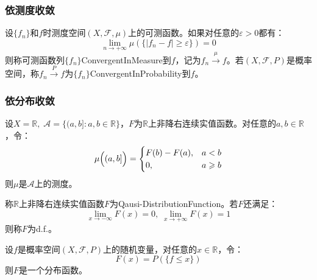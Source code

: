 \subsubsection{依测度收敛}
\begin{definition}
	设$\{f_n\}$和$f$时测度空间$(X,\mathscr{F},\mu)$上的可测函数。如果对任意的$\varepsilon>0$都有：
	\begin{equation*}
		\lim_{n\to+\infty}\mu(\{|f_n-f|\geqslant\varepsilon\})=0
	\end{equation*}
	则称可测函数列$\{f_n\}$\gls{ConvergentInMeasure}到$f$，记为$f_n\overset{\mu}{\longrightarrow}f$。若$(X,\mathscr{F},P)$是概率空间，称$f_n\overset{P}{\longrightarrow}f$为$\{f_n\}$\gls{ConvergentInProbability}到$f$。
\end{definition}
\subsubsection{依分布收敛}
\begin{theorem}
	设$X=\mathbb{R},\;\mathscr{A}=\{(a,b]:a,b\in\mathbb{R}\}$，$F$为$\mathbb{R}$上非降右连续实值函数。对任意的$a,b\in\mathbb{R}$，令：
	\begin{equation*}
		\mu\Bigl((a,b]\Bigr)=
		\begin{cases}
			F(b)-F(a),&a<b \\
			0,&a\geqslant b
		\end{cases}
	\end{equation*}
	则$\mu$是$\mathscr{A}$上的测度。
\end{theorem}
\begin{definition}
	称$\mathbb{R}$上非降右连续实值函数$F$为\gls{Qausi-DistributionFunction}。若$F$还满足：
	\begin{equation*}
		\lim_{x\to-\infty}F(x)=0,\;\lim_{x\to+\infty}F(x)=1
	\end{equation*}
	则称$F$为\gls{d.f.}。
\end{definition}
\begin{theorem}
	设$f$是概率空间$(X,\mathscr{F},P)$上的随机变量，对任意的$x\in\mathbb{R}$，令：
	\begin{equation*}
		F(x)=P(\{f\leqslant x\})
	\end{equation*}
	则$F$是一个分布函数。
\end{theorem}
